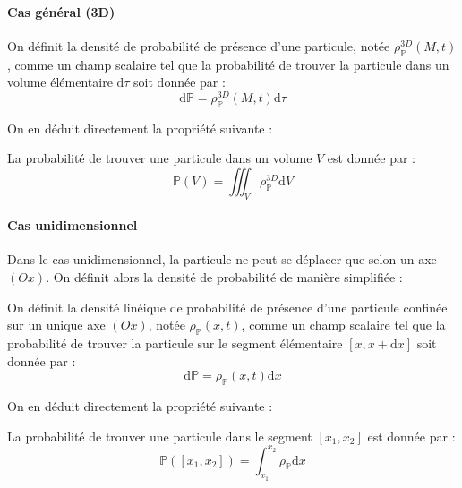 \documentclass[11pt,fleqn]{book} %
\newcommand{\dd}{\mathrm{d}}
\begin{document}
\paragraph{Cas général (3D)}

\begin{definition}
	On définit la densité de probabilité de présence d'une particule, notée $\rho^{3D}_\mathbb{P}(M,t)$, comme un champ scalaire tel que la probabilité de trouver la particule dans un volume élémentaire $\dd \tau$ soit donnée par :
	\begin{equation}
		\dd \mathbb{P} = \rho^{3D}_\mathbb{P}(M,t) \dd \tau
	\end{equation}
\end{definition}

On en déduit directement la propriété suivante :
\begin{proposition}
	La probabilité de trouver une particule dans un volume $V$ est donnée par :
	\begin{equation}
		\mathbb{P}(V) = \iiint_V \rho^{3D}_\mathbb{P} \dd V
	\end{equation}
\end{proposition}

\paragraph{Cas unidimensionnel}

Dans le cas unidimensionnel, la particule ne peut se déplacer que selon un axe $(Ox)$. On définit alors la densité de probabilité de manière simplifiée : 

\begin{definition}
	On définit la densité linéique de probabilité de présence d'une particule confinée sur un unique axe $(Ox)$, notée $\rho_\mathbb{P}(x,t)$, comme un champ scalaire tel que la probabilité de trouver la particule sur le segment élémentaire $[x,x+\dd x]$ soit donnée par :
	\begin{equation}
		\dd \mathbb{P} = \rho_\mathbb{P}(x,t) \dd x
	\end{equation}
\end{definition}

On en déduit directement la propriété suivante :
\begin{proposition}
	La probabilité de trouver une particule dans le segment $[x_1,x_2]$ est donnée par :
	\begin{equation}
		\mathbb{P}([x_1,x_2]) = \int_{x_1}^{x_2} \rho_\mathbb{P} \dd x
	\end{equation}
\end{proposition}
\end{document}
